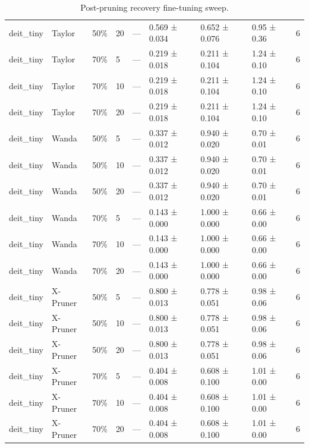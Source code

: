\begin{table}[t]
\begin{tabular}{lllllllll}
deit\_tiny & Taylor & 50\% & 20 & — & 0.569 ± 0.034 & 0.652 ± 0.076 & 0.95 ± 0.36 & 6 \\
deit\_tiny & Taylor & 70\% & 5 & — & 0.219 ± 0.018 & 0.211 ± 0.104 & 1.24 ± 0.10 & 6 \\
deit\_tiny & Taylor & 70\% & 10 & — & 0.219 ± 0.018 & 0.211 ± 0.104 & 1.24 ± 0.10 & 6 \\
deit\_tiny & Taylor & 70\% & 20 & — & 0.219 ± 0.018 & 0.211 ± 0.104 & 1.24 ± 0.10 & 6 \\
deit\_tiny & Wanda & 50\% & 5 & — & 0.337 ± 0.012 & 0.940 ± 0.020 & 0.70 ± 0.01 & 6 \\
deit\_tiny & Wanda & 50\% & 10 & — & 0.337 ± 0.012 & 0.940 ± 0.020 & 0.70 ± 0.01 & 6 \\
deit\_tiny & Wanda & 50\% & 20 & — & 0.337 ± 0.012 & 0.940 ± 0.020 & 0.70 ± 0.01 & 6 \\
deit\_tiny & Wanda & 70\% & 5 & — & 0.143 ± 0.000 & 1.000 ± 0.000 & 0.66 ± 0.00 & 6 \\
deit\_tiny & Wanda & 70\% & 10 & — & 0.143 ± 0.000 & 1.000 ± 0.000 & 0.66 ± 0.00 & 6 \\
deit\_tiny & Wanda & 70\% & 20 & — & 0.143 ± 0.000 & 1.000 ± 0.000 & 0.66 ± 0.00 & 6 \\
deit\_tiny & X-Pruner & 50\% & 5 & — & 0.800 ± 0.013 & 0.778 ± 0.051 & 0.98 ± 0.06 & 6 \\
deit\_tiny & X-Pruner & 50\% & 10 & — & 0.800 ± 0.013 & 0.778 ± 0.051 & 0.98 ± 0.06 & 6 \\
deit\_tiny & X-Pruner & 50\% & 20 & — & 0.800 ± 0.013 & 0.778 ± 0.051 & 0.98 ± 0.06 & 6 \\
deit\_tiny & X-Pruner & 70\% & 5 & — & 0.404 ± 0.008 & 0.608 ± 0.100 & 1.01 ± 0.00 & 6 \\
deit\_tiny & X-Pruner & 70\% & 10 & — & 0.404 ± 0.008 & 0.608 ± 0.100 & 1.01 ± 0.00 & 6 \\
deit\_tiny & X-Pruner & 70\% & 20 & — & 0.404 ± 0.008 & 0.608 ± 0.100 & 1.01 ± 0.00 & 6 \\
\bottomrule
\end{tabular}
\caption{Post-pruning recovery fine-tuning sweep.}
\label{tab:recovery_sweep}
\end{table}